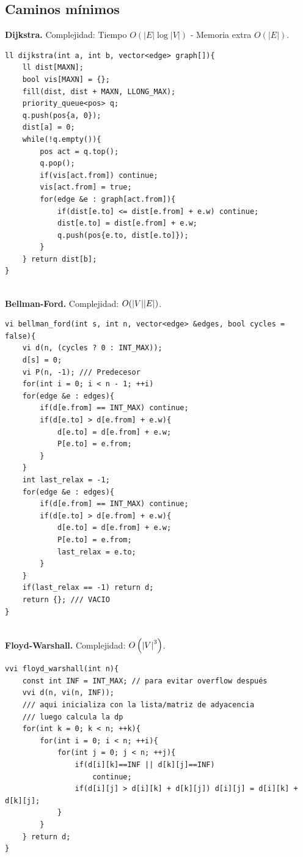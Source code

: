 \documentclass[10pt,spanish,mexico]{article}
\numberwithin{equation}{section}
\newcommand{\pa}[1]{\left( #1 \right)}
\begin{document}
\begin{multicols}{2}
\subsection{Caminos mínimos}
\textbf{Dijkstra.} Complejidad: Tiempo $O(|E| \log |V|)$ - Memoria extra $O(|E|)$.
\begin{verbatim}
ll dijkstra(int a, int b, vector<edge> graph[]){
    ll dist[MAXN];
    bool vis[MAXN] = {};
    fill(dist, dist + MAXN, LLONG_MAX);
    priority_queue<pos> q;
    q.push(pos{a, 0});
    dist[a] = 0;
    while(!q.empty()){
        pos act = q.top();
        q.pop();
        if(vis[act.from]) continue;
        vis[act.from] = true;
        for(edge &e : graph[act.from]){
            if(dist[e.to] <= dist[e.from] + e.w) continue;
            dist[e.to] = dist[e.from] + e.w;
            q.push(pos{e.to, dist[e.to]});
        }
    } return dist[b];
}
\end{verbatim}

\vspace{-1.2\baselineskip}
\hrulefill\\
\textbf{Bellman-Ford.} Complejidad: $O(\abs{V}\abs{E})$.
\begin{verbatim}
vi bellman_ford(int s, int n, vector<edge> &edges, bool cycles = false){
    vi d(n, (cycles ? 0 : INT_MAX));
    d[s] = 0;
    vi P(n, -1); /// Predecesor
    for(int i = 0; i < n - 1; ++i)
    for(edge &e : edges){
        if(d[e.from] == INT_MAX) continue;
        if(d[e.to] > d[e.from] + e.w){
            d[e.to] = d[e.from] + e.w;
            P[e.to] = e.from;
        }
    }
    int last_relax = -1;
    for(edge &e : edges){
        if(d[e.from] == INT_MAX) continue;
        if(d[e.to] > d[e.from] + e.w){
            d[e.to] = d[e.from] + e.w;
            P[e.to] = e.from;
            last_relax = e.to;
        }
    }
    if(last_relax == -1) return d;
    return {}; /// VACIO
}
\end{verbatim}

\vspace{-1.2\baselineskip}
\hrulefill \\
\textbf{Floyd-Warshall.} Complejidad: $O\pa{\abs{V}^3}$.
\begin{verbatim}
vvi floyd_warshall(int n){
    const int INF = INT_MAX; // para evitar overflow después
    vvi d(n, vi(n, INF));
    /// aqui inicializa con la lista/matriz de adyacencia
    /// luego calcula la dp
    for(int k = 0; k < n; ++k){
        for(int i = 0; i < n; ++i){
            for(int j = 0; j < n; ++j){
                if(d[i][k]==INF || d[k][j]==INF)
                    continue;
                if(d[i][j] > d[i][k] + d[k][j]) d[i][j] = d[i][k] + d[k][j];
            }
        }
    } return d;
}
\end{verbatim}


\end{multicols}
\end{document}
